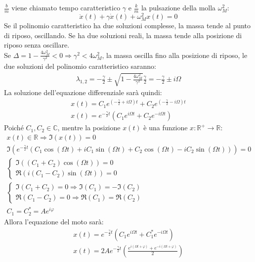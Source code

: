 \documentclass{article}
\numberwithin{equation}{subsection}
\begin{document}
$\displaystyle\frac{b}{m}$ viene chiamato tempo caratteristico 
$\gamma$ e $\displaystyle\frac{k}{m}$ 
la pulsazione della molla $\omega_M^{2}$:
\begin{equation}
    \ddot x(t)+\gamma\dot x(t)+\omega_M^{2}x(t)=0
\end{equation}
Se il polinomio caratteristico ha due soluzioni complesse, 
la massa tende al punto di riposo, oscillando. Se ha 
due soluzioni reali, la massa tende alla posizione di riposo 
senza oscillare.\\
Se $\Delta=1-\displaystyle\frac{4\omega_M^{2}}{\gamma^{2}} <0\Rightarrow \gamma^{2} < 4\omega_M^{2}$, 
la massa oscilla fino alla posizione di riposo, le due 
soluzioni del polinomio caratteristico saranno:
\begin{gather*}
    \lambda_{1,2}=-\displaystyle\frac{\gamma}{2}\pm\sqrt{1-\displaystyle\frac{4\omega_M^{2}}{\gamma^{2}}}\displaystyle\frac{\gamma}{2}=-\frac{\gamma}{2}\pm i\Omega
\end{gather*}
La soluzione dell'equazione differenziale sarà quindi:
\begin{gather*}
    \displaystyle x(t)=C_1e^{\left(-\displaystyle\frac{\gamma}{2}+ i\Omega\right)t}+C_2e^{\left(-\displaystyle\frac{\gamma}{2}- i\Omega\right)t}\\
    x(t)=e^{-\frac{\gamma}{2}t}\left(C_1e^{i\Omega t}+C_2e^{-i\Omega t}\right)
\end{gather*}
Poiché $C_1,C_2\in\mathbb{C}$, mentre la posizione $x(t)$ è una funzione $x:\mathbb{R}^+\to\mathbb{R}$:
\begin{gather*}
    x(t)\in\mathbb{R}\Rightarrow \Im(x(t))=0\\
    \Im\left(e^{-\displaystyle\frac{\gamma}{2}t}(C_1\cos(\Omega t)+iC_1\sin(\Omega t)+C_2\cos(\Omega t)-iC_2\sin(\Omega t))\right)=0\\
    \begin{cases}
        \Im((C_1+C_2)\cos(\Omega t))=0\\
        \Re(i(C_1-C_2)\sin(\Omega t))=0
    \end{cases}\\ 
    \begin{cases}
        \Im(C_1+C_2)=0\Rightarrow \Im(C_1)=-\Im(C_2)\\
        \Re(C_1-C_2)=0\Rightarrow \Re(C_1)=\Re(C_2)
    \end{cases}\\ 
    C_1=C_2^{*}=Ae^{i\varphi}
\end{gather*}
Allora l'equazione del moto sarà:
\begin{gather*}
    x(t)=e^{-\frac{\gamma}{2}t}(C_1e^{i\Omega t}+C_1^*e^{-i\Omega t})\\
    x(t)=2Ae^{-\frac{\gamma}{2}t}\left(\displaystyle\frac{e^{i(\Omega t+\varphi)}+e^{-i(\Omega t+\varphi)}}{2}\right)\\
\end{gather*}
\end{document}
